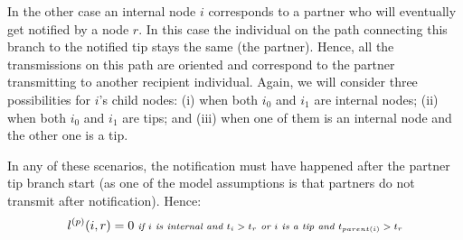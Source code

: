 \documentclass[a4paper,10pt]{article}
\begin{document}


In the other case an internal node $i$ corresponds to a partner who will eventually get notified by a node $r$. In this case the individual on the path connecting this branch to the notified tip stays the same (the partner). Hence, all the transmissions on this path are oriented and correspond to the partner transmitting to another recipient individual. %
Again, we will consider three possibilities for $i$'s child nodes: (i) when both $i_0$ and $i_1$ are internal nodes; (ii) when both $i_0$ and $i_1$ are tips; and (iii) when one of them is an internal node and the other one is a tip.

In any of these scenarios, the notification must have happened after the partner tip branch start (as one of the model assumptions is that partners do not transmit after notification). Hence:
\begin{equation}
\scriptsize
l^{(p)}(i, r) = 0 \textit{~if $i$ is internal and $t_i > t_r$ or $i$ is a tip and $t_{parent(i)} > t_r$} \\
\label{eq:lp-zero}
\end{equation}
\end{document}
